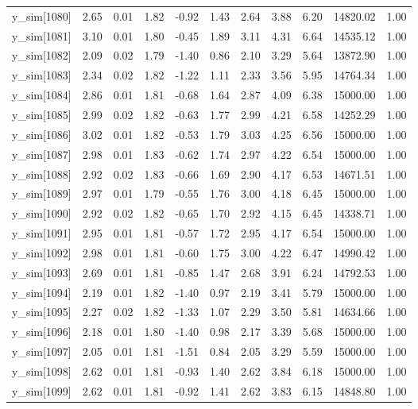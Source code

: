\begin{table}[ht]
\begin{tabular}{rrrrrrrrrrr}
  y\_sim[1080] & 2.65 & 0.01 & 1.82 & -0.92 & 1.43 & 2.64 & 3.88 & 6.20 & 14820.02 & 1.00 \\ 
  y\_sim[1081] & 3.10 & 0.01 & 1.80 & -0.45 & 1.89 & 3.11 & 4.31 & 6.64 & 14535.12 & 1.00 \\ 
  y\_sim[1082] & 2.09 & 0.02 & 1.79 & -1.40 & 0.86 & 2.10 & 3.29 & 5.64 & 13872.90 & 1.00 \\ 
  y\_sim[1083] & 2.34 & 0.02 & 1.82 & -1.22 & 1.11 & 2.33 & 3.56 & 5.95 & 14764.34 & 1.00 \\ 
  y\_sim[1084] & 2.86 & 0.01 & 1.81 & -0.68 & 1.64 & 2.87 & 4.09 & 6.38 & 15000.00 & 1.00 \\ 
  y\_sim[1085] & 2.99 & 0.02 & 1.82 & -0.63 & 1.77 & 2.99 & 4.21 & 6.58 & 14252.29 & 1.00 \\ 
  y\_sim[1086] & 3.02 & 0.01 & 1.82 & -0.53 & 1.79 & 3.03 & 4.25 & 6.56 & 15000.00 & 1.00 \\ 
  y\_sim[1087] & 2.98 & 0.01 & 1.83 & -0.62 & 1.74 & 2.97 & 4.22 & 6.54 & 15000.00 & 1.00 \\ 
  y\_sim[1088] & 2.92 & 0.02 & 1.83 & -0.66 & 1.69 & 2.90 & 4.17 & 6.53 & 14671.51 & 1.00 \\ 
  y\_sim[1089] & 2.97 & 0.01 & 1.79 & -0.55 & 1.76 & 3.00 & 4.18 & 6.45 & 15000.00 & 1.00 \\ 
  y\_sim[1090] & 2.92 & 0.02 & 1.82 & -0.65 & 1.70 & 2.92 & 4.15 & 6.45 & 14338.71 & 1.00 \\ 
  y\_sim[1091] & 2.95 & 0.01 & 1.81 & -0.57 & 1.72 & 2.95 & 4.17 & 6.54 & 15000.00 & 1.00 \\ 
  y\_sim[1092] & 2.98 & 0.01 & 1.81 & -0.60 & 1.75 & 3.00 & 4.22 & 6.47 & 14990.42 & 1.00 \\ 
  y\_sim[1093] & 2.69 & 0.01 & 1.81 & -0.85 & 1.47 & 2.68 & 3.91 & 6.24 & 14792.53 & 1.00 \\ 
  y\_sim[1094] & 2.19 & 0.01 & 1.82 & -1.40 & 0.97 & 2.19 & 3.41 & 5.79 & 15000.00 & 1.00 \\ 
  y\_sim[1095] & 2.27 & 0.02 & 1.82 & -1.33 & 1.07 & 2.29 & 3.50 & 5.81 & 14634.66 & 1.00 \\ 
  y\_sim[1096] & 2.18 & 0.01 & 1.80 & -1.40 & 0.98 & 2.17 & 3.39 & 5.68 & 15000.00 & 1.00 \\ 
  y\_sim[1097] & 2.05 & 0.01 & 1.81 & -1.51 & 0.84 & 2.05 & 3.29 & 5.59 & 15000.00 & 1.00 \\ 
  y\_sim[1098] & 2.62 & 0.01 & 1.81 & -0.93 & 1.40 & 2.62 & 3.84 & 6.18 & 15000.00 & 1.00 \\ 
  y\_sim[1099] & 2.62 & 0.01 & 1.81 & -0.92 & 1.41 & 2.62 & 3.83 & 6.15 & 14848.80 & 1.00 \\ 

\end{tabular}
\end{table}
